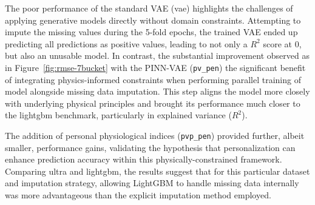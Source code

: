 The poor performance of the standard VAE (vae) highlights the challenges of applying generative models directly without domain constraints. Attempting to impute the missing values during the 5-fold epochs, the trained VAE ended up predicting all predictions as positive values, leading to not only a $R^2$ score at 0, but also an unusable model. In contrast, the substantial improvement observed as in Figure~\ref{fig:rmse-7bucket} with the PINN-VAE (\texttt{pv\_pen}) the significant benefit of integrating physics-informed constraints when performing parallel training of model alongside missing data imputation. This step aligns the model more closely with underlying physical principles and brought its performance much closer to the lightgbm benchmark, particularly in explained variance ($R^2$).

The addition of personal physiological indices (\texttt{pvp\_pen}) provided further, albeit smaller, performance gains, validating the hypothesis that personalization can enhance prediction accuracy within this physically-constrained framework. Comparing ultra and lightgbm, the results suggest that for this particular dataset and imputation strategy, allowing LightGBM to handle missing data internally was more advantageous than the explicit imputation method employed.

